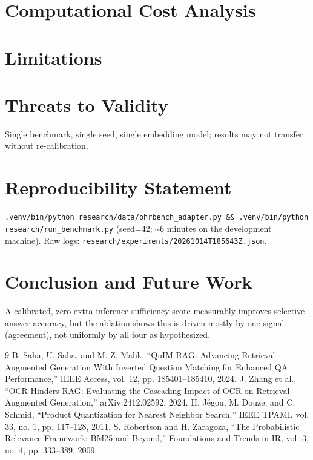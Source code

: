 \documentclass[conference]{IEEEtran}
\begin{document}
\section{Computational Cost Analysis}

\section{Limitations}

\section{Threats to Validity}
Single benchmark, single seed, single embedding model; results may not transfer
without re-calibration.

\section{Reproducibility Statement}
\texttt{.venv/bin/python research/data/ohrbench\_adapter.py \&\& .venv/bin/python
research/run\_benchmark.py} (seed=42; \textasciitilde6 minutes on the development
machine). Raw logs: \texttt{research/experiments/20261014T185643Z.json}.

\section{Conclusion and Future Work}
A calibrated, zero-extra-inference sufficiency score measurably improves selective
answer accuracy, but the ablation shows this is driven mostly by one signal
(agreement), not uniformly by all four as hypothesized.


\begin{thebibliography}{9}
 B. Saha, U. Saha, and M. Z. Malik, ``QuIM-RAG: Advancing
Retrieval-Augmented Generation With Inverted Question Matching for Enhanced QA
Performance,'' IEEE Access, vol. 12, pp. 185401--185410, 2024.
 J. Zhang et al., ``OCR Hinders RAG: Evaluating the
Cascading Impact of OCR on Retrieval-Augmented Generation,'' arXiv:2412.02592, 2024.
 H. J\'egou, M. Douze, and C. Schmid, ``Product Quantization for
Nearest Neighbor Search,'' IEEE TPAMI, vol. 33, no. 1, pp. 117--128, 2011.
 S. Robertson and H. Zaragoza, ``The Probabilistic
Relevance Framework: BM25 and Beyond,'' Foundations and Trends in IR, vol. 3, no. 4,
pp. 333--389, 2009.
\end{thebibliography}
\end{document}
